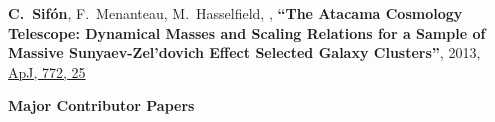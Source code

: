 \documentclass{article}
\def\myself{\textbf{\color{red} C.~Sif\'on}}
\def\apj{ApJ}
\begin{document}
\begin{etaremune}
\item 
\myself, F.~Menanteau, M.~Hasselfield, ,
\textbf{``The Atacama Cosmology Telescope: Dynamical Masses and Scaling Relations for a Sample of
Massive Sunyaev-Zel'dovich Effect Selected Galaxy Clusters''}, 
2013, \href{https://adsabs.harvard.edu/abs/2013ApJ...772...25S}{\apj, 772, 25}

\end{etaremune}

\vspace{0.4cm}
\noindent
{\bf\Large Major Contributor Papers}\\
\end{document}
